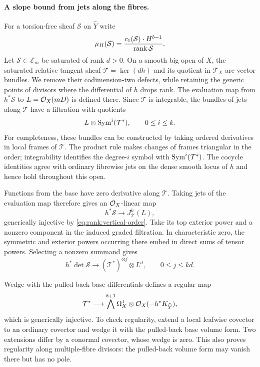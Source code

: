 \paragraph{A slope bound from jets along the fibres.}
For a torsion-free sheaf $\mathcal S$ on $\widehat Y$ write
\[
  \mu_H(\mathcal S)
  =\frac{c_1(\mathcal S)\cdot H^{b-1}}{\operatorname{rank}\mathcal S}.
\]
Let $\mathcal S\subset\mathcal E_m$ be saturated of rank $d>0$.
On a smooth big open of $X$, the saturated relative tangent sheaf
$\mathcal T=\ker(dh)$ and its quotient in $\mathcal T_X$ are vector
bundles.  We remove their codimension-two defects, while retaining the
generic points of divisors where the differential of $h$ drops rank.
The evaluation map from $h^*\mathcal S$ to
$L=\mathcal O_X(mD)$ is defined there.  Since $\mathcal T$ is integrable, the
bundles of jets along $\mathcal T$ have a filtration with quotients
\[
  L\otimes\operatorname{Sym}^i(\mathcal T^*),\qquad 0\le i\le k.
\]
For completeness, these bundles can be constructed by taking ordered
derivatives in local frames of $\mathcal T$.  The product rule makes
changes of frames triangular in the order; integrability identifies the
degree-$i$ symbol with $\operatorname{Sym}^i(\mathcal T^*)$.  The cocycle identities
agree with ordinary fibrewise jets on the dense smooth locus of $h$
and hence hold throughout this open.

Functions from the base have zero derivative along $\mathcal T$.
Taking jets of the evaluation map therefore gives an $\mathcal O_X$-linear map
\[
  h^*\mathcal S\longrightarrow J^k_{\mathcal T}(L),
\]
generically injective by \eqref{eq:rank:vertical-order}.  Take its top
exterior power and a nonzero component in the induced graded
filtration.  In characteristic zero, the symmetric and exterior powers
occurring there embed in direct sums of tensor powers.  Selecting a
nonzero summand gives
\begin{equation}\label{eq:rank:jet-determinant}
  h^*\det\mathcal S\longrightarrow
       (\mathcal T^*)^{\otimes j}\otimes L^d,
  \qquad 0\le j\le kd.
\end{equation}

Wedge with the pulled-back base differentials defines a regular map
\begin{equation}\label{eq:rank:base-wedge}
  \mathcal T^*\longrightarrow
  \bigwedge^{b+1}\Omega_X^1\otimes\mathcal O_X(-h^*K_{\widehat Y}),
\end{equation}
which is generically injective.  To check regularity, extend a local
leafwise covector to an ordinary covector and wedge it with the pulled-back
base volume form.  Two extensions differ by a conormal covector, whose
wedge is zero.  This also proves regularity along multiple-fibre
divisors: the pulled-back volume form may vanish there but has no pole.

